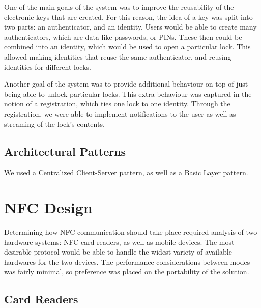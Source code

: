 \documentclass[12pt]{report}
\let\Oldsection\section
\renewcommand{\section}{\FloatBarrier\Oldsection}
\let\Oldsubsection\subsection
\renewcommand{\subsection}{\FloatBarrier\Oldsubsection}
\begin{document}
One of the main goals of the system was to improve the reusability of the electronic keys that are created. For this
reason, the idea of a key was split into two parts: an authenticator, and an identity. Users would be able to create
many authenticators, which are data like passwords, or PINs. These then could be combined into an identity, which
would be used to open a particular lock. This allowed making identities that reuse the same authenticator, and reusing
identities for different locks.

Another goal of the system was to provide additional behaviour on top of just being able to unlock particular locks.
This extra behaviour was captured in the notion of a registration, which ties one lock to one identity. Through the
registration, we were able to implement notifications to the user as well as streaming of the lock's contents.


\subsection{Architectural Patterns} \label{architectural-patterns}


We used a Centralized Client-Server pattern, as well as a Basic Layer pattern.


\section{NFC Design} \label{nfc-design}

Determining how NFC communication should take place required analysis of two hardware systems: NFC card readers, as well
as mobile devices. The most desirable protocol would be able to handle the widest variety of available hardwares for
the two devices. The performance considerations between modes was fairly minimal, so preference was placed on the
portability of the solution.


\subsection{Card Readers} \label{card-readers}
\end{document}
